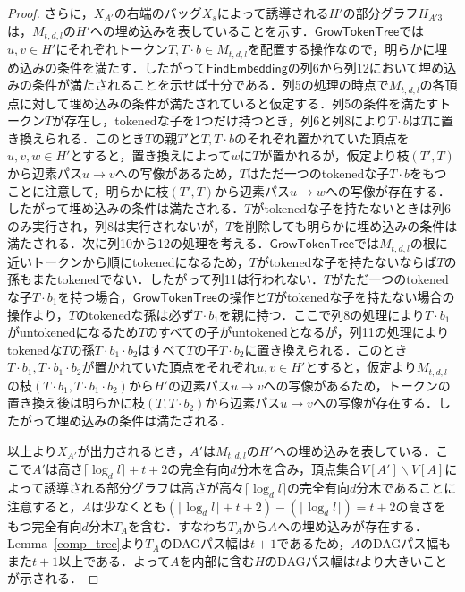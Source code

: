 \documentclass[master]{kuisthesis}		%
\theoremstyle{plain}
\theoremstyle{definition}
\begin{document}
\begin{proof}
さらに，$X_{A'}$の右端のバッグ$X_s$によって誘導される$H'$の部分グラフ$H_{A'3}$は，$M_{t, d, l}$の$H'$への埋め込みを表していることを示す．$\mathsf{GrowTokenTree}$では$u, v \in H'$にそれぞれトークン$T, T\cdot b \in M_{t, d, l}$を配置する操作なので，明らかに埋め込みの条件を満たす．したがって$\mathsf{FindEmbedding}$の列6から列12において埋め込みの条件が満たされることを示せば十分である．列5の処理の時点で$M_{t, d, l}$の各頂点に対して埋め込みの条件が満たされていると仮定する．列5の条件を満たすトークン$T$が存在し，tokenedな子を1つだけ持つとき，列6と列8により$T \cdot b$は$T$に置き換えられる．このとき$T$の親$T'$と$T, T \cdot b$のそれぞれ置かれていた頂点を$u, v, w \in H'$とすると，置き換えによって$w$に$T$が置かれるが，仮定より枝$(T', T)$から辺素パス$u \rightarrow v$への写像があるため，$T$はただ一つのtokenedな子$T \cdot b$をもつことに注意して，明らかに枝$(T', T)$から辺素パス$u \rightarrow w$への写像が存在する．したがって埋め込みの条件は満たされる．$T$がtokenedな子を持たないときは列6のみ実行され，列8は実行されないが，$T$を削除しても明らかに埋め込みの条件は満たされる．次に列10から12の処理を考える．$\mathsf{GrowTokenTree}$では$M_{t, d, l}$の根に近いトークンから順にtokenedになるため，$T$がtokenedな子を持たないならば$T$の孫もまたtokenedでない．したがって列11は行われない．$T$がただ一つのtokenedな子$T \cdot b_1$を持つ場合，$\mathsf{GrowTokenTree}$の操作と$T$がtokenedな子を持たない場合の操作より，$T$のtokenedな孫は必ず$T \cdot b_1$を親に持つ．ここで列8の処理により$T \cdot b_1$がuntokenedになるため$T$のすべての子がuntokenedとなるが，列11の処理によりtokenedな$T$の孫$T \cdot b_1 \cdot b_2$はすべて$T$の子$T \cdot b_2$に置き換えられる．このとき$T \cdot b_1, T \cdot b_1 \cdot b_2$が置かれていた頂点をそれぞれ$u, v \in H'$とすると，仮定より$M_{t, d, l}$の枝$(T \cdot b_1, T \cdot b_1 \cdot b_2)$から$H'$の辺素パス$u \rightarrow v$への写像があるため，トークンの置き換え後は明らかに枝$(T, T \cdot b_2)$から辺素パス$u \rightarrow v$への写像が存在する．したがって埋め込みの条件は満たされる．

以上より$X_{A'}$が出力されるとき，$A'$は$M_{t, d, l}$の$H'$への埋め込みを表している．ここで$A'$は高さ$\lceil \log_d l \rceil +t+2$の完全有向$d$分木を含み，頂点集合$V[A'] \backslash V[A]$によって誘導される部分グラフは高さが高々$\lceil \log_d l \rceil$の完全有向$d$分木であることに注意すると，$A$は少なくとも$(\lceil \log_d l \rceil +t+2) -(\lceil \log_d l \rceil) = t+2$の高さをもつ完全有向$d$分木$T_A$を含む．すなわち$T_A$から$A$への埋め込みが存在する．Lemma~\ref{comp_tree}より$T_A$のDAGパス幅は$t+1$であるため，$A$のDAGパス幅もまた$t+1$以上である．よって$A$を内部に含む$H$のDAGパス幅は$t$より大きいことが示される．


\end{proof}
\end{document}
